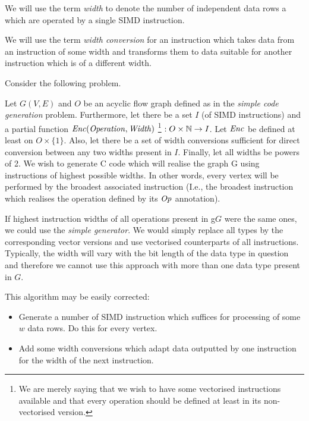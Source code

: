 \label{sec:vecgensec}

We will use the term \emph{width} to denote the number of independent data rows a which are operated by a single SIMD instruction.
\myenddef

  We will use the term \emph{width conversion} for an instruction which takes data from an instruction of some width and transforms them to data suitable for another instruction which is of a different width. 
\myenddef

Consider the following problem.

  Let $G(V,E)$ and $O$ be an acyclic flow graph defined as in the \emph{simple code generation} problem. Furthermore, let there be a set $I$ (of SIMD instructions) and a partial function $\mf{enc} (\mf{operation}, \mf{width})$ \footnote{We are merely saying that we wish to have some vectorised instructions available and that every operation should be defined at least in its non-vectorised version.} $: O \times \mathbb{N} \rightarrow I$. Let $\mf{enc}$ be defined at least on $O \times \{1\}$. Also, let there be a set of width conversions sufficient for direct conversion between any two widths present in $I$. Finally, let all widths be powers of 2. We wish to generate C code which will realise the graph G using instructions of highest possible widths. In other words, every vertex will be performed by the broadest associated instruction (I.e., the broadest instruction which realises the operation defined by its $\mf{op}$ annotation). 
\myendprob

If highest instruction widths of all operations present in g$G$ were the same ones, we could use the \emph{simple generator}. We would simply replace all types by the corresponding vector versions and use vectorised counterparts of all instructions. Typically, the width will vary with the bit length of the data type in question and therefore we cannot use this approach with more than one data type present in $G$.


This algorithm may be easily corrected:
\begin{itemize}
  \item Generate a number of SIMD instruction which suffices for processing of some $w$ data rows. Do this for every vertex.
  \item Add some width conversions which adapt data outputted by one instruction for the width of the next instruction.
\end{itemize}

